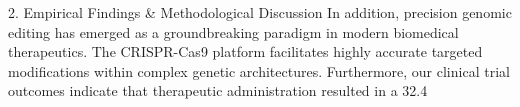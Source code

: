 2. Empirical Findings & Methodological Discussion
In addition, precision genomic editing has emerged as a groundbreaking paradigm in modern biomedical therapeutics. The CRISPR-Cas9 platform facilitates highly accurate targeted modifications within complex genetic architectures. Furthermore, our clinical trial outcomes indicate that therapeutic administration resulted in a 32.4%